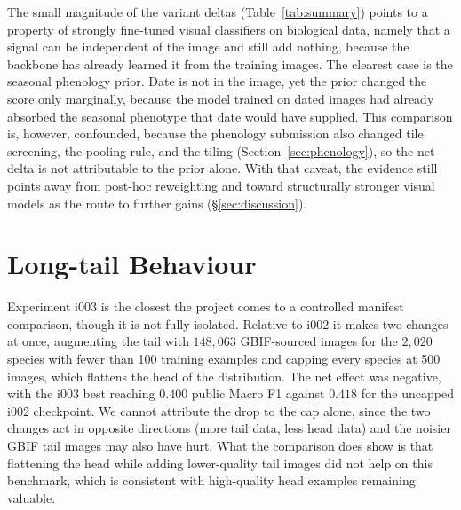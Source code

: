 The small magnitude of the variant deltas (Table~\ref{tab:summary}) points to a property of strongly fine-tuned visual classifiers on biological data, namely that a signal can be independent of the image and still add nothing, because the backbone has already learned it from the training images. The clearest case is the seasonal phenology prior. Date is not in the image, yet the prior changed the score only marginally, because the model trained on dated images had already absorbed the seasonal phenotype that date would have supplied. This comparison is, however, confounded, because the phenology submission also changed tile screening, the pooling rule, and the tiling (Section~\ref{sec:phenology}), so the net delta is not attributable to the prior alone. With that caveat, the evidence still points away from post-hoc reweighting and toward structurally stronger visual models as the route to further gains (\S\ref{sec:discussion}).

\section{Long-tail Behaviour}
\label{sec:longtail}

Experiment i003 is the closest the project comes to a controlled manifest comparison, though it is not fully isolated. Relative to i002 it makes two changes at once, augmenting the tail with $148{,}063$ GBIF-sourced images for the $2{,}020$ species with fewer than 100 training examples and capping every species at 500 images, which flattens the head of the distribution. The net effect was negative, with the i003 best reaching $0.400$ public Macro F1 against $0.418$ for the uncapped i002 checkpoint. We cannot attribute the drop to the cap alone, since the two changes act in opposite directions (more tail data, less head data) and the noisier GBIF tail images may also have hurt. What the comparison does show is that flattening the head while adding lower-quality tail images did not help on this benchmark, which is consistent with high-quality head examples remaining valuable.
